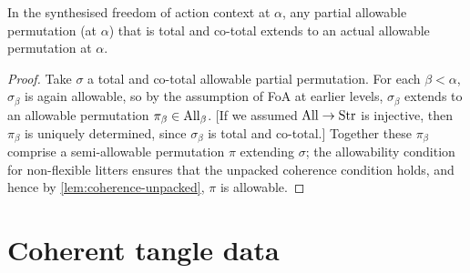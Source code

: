 \begin{proposition}
  \label{prop:total-allowable-partial-perm-actual}
  In the synthesised freedom of action context at $\alpha$, any partial allowable permutation (at $\alpha$) that is total and co-total extends to an actual allowable permutation at $\alpha$.
\end{proposition}

\begin{proof}
  Take $\sigma$ a total and co-total allowable partial permutation.  For each $\beta < \alpha$, $\sigma_\beta$ is again allowable, so by the assumption of FoA at earlier levels, $\sigma_\beta$ extends to an allowable permutation $\pi_\beta \in \mathrm{All}_\beta$. [If we assumed $\mathrm{All} \to \mathrm{Str}$ is injective, then $\pi_\beta$ is uniquely determined, since $\sigma_\beta$ is total and co-total.]  Together these $\pi_\beta$ comprise a semi-allowable permutation $\pi$ extending $\sigma$; the allowability condition for non-flexible litters ensures that the unpacked coherence condition holds, and hence by \cref{lem:coherence-unpacked}, $\pi$ is allowable.
\end{proof}

\section{Coherent tangle data}

